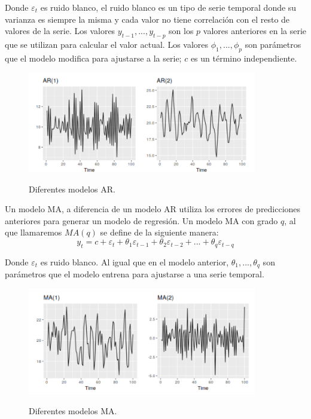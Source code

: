 Donde $\varepsilon_t$ es ruido blanco, el ruido blanco es un tipo de serie temporal donde su varianza es siempre la misma y cada valor no tiene correlación con el resto de valores de la serie. Los valores $y_{t-1}, ..., y_{t-p}$ son los $p$ valores anteriores en la serie que se utilizan para calcular el valor actual. Los valores $\phi_1, ..., \phi_p$ son parámetros que el modelo modifica para ajustarse a la serie; $c$ es un término independiente.\newline

\begin{figure}[h]
	\centering
	\includegraphics[width=100mm]{imagenes/autoregression_example.png}
	\label{fig:211}
	\caption{Diferentes modelos AR.}
\end{figure}
\verticalspace

Un modelo MA, a diferencia de un modelo AR utiliza los errores de predicciones anteriores para generar un modelo de regresión. Un modelo MA con grado $q$, al que llamaremos $MA(q)$ se define de la siguiente manera:
$$ y_t = c + \varepsilon_t + \theta_1 \varepsilon_{t-1} + \theta_2 \varepsilon_{t-2} + ... + \theta_q \varepsilon_{t-q}$$

Donde $\varepsilon_t$ es ruido blanco. Al igual que en el modelo anterior, $\theta_1, ..., \theta_q$ son parámetros que el modelo entrena para ajustarse a una serie temporal.

\begin{figure}[h]
	\centering
	\includegraphics[width=100mm]{imagenes/moving_averages_example.png}
	\label{fig:212}
	\caption{Diferentes modelos MA.}
\end{figure}
\verticalspace

